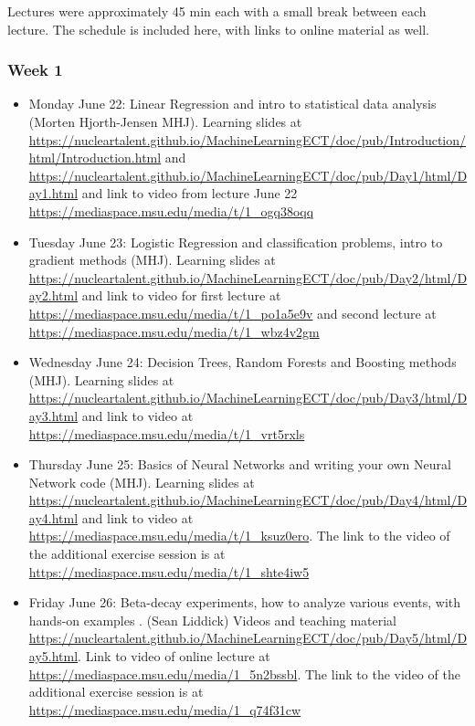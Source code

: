 \documentclass[prc,amsart,english]{revtex4}
\begin{document}
Lectures were approximately 45 min each with a small break between each lecture. 
The schedule is included here, with links to online material as well.

\subsubsection{Week 1}

\begin{itemize}
\item  Monday June 22:  Linear Regression and intro to statistical data analysis	(Morten Hjorth-Jensen MHJ). Learning slides at
\url{https://nucleartalent.github.io/MachineLearningECT/doc/pub/Introduction/html/Introduction.html} and \url{https://nucleartalent.github.io/MachineLearningECT/doc/pub/Day1/html/Day1.html} and link to  video from lecture June 22 \url{https://mediaspace.msu.edu/media/t/1_ogq38oqq}
\item Tuesday June 23:	Logistic Regression and classification problems, intro to gradient methods	(MHJ). Learning slides at \url{https://nucleartalent.github.io/MachineLearningECT/doc/pub/Day2/html/Day2.html} and link to  video for first lecture at \url{https://mediaspace.msu.edu/media/t/1_po1a5e9v} and second lecture at \url{https://mediaspace.msu.edu/media/t/1_wbz4v2gm}
\item Wednesday June 24:	Decision Trees, Random Forests and Boosting methods (MHJ). Learning slides at \url{https://nucleartalent.github.io/MachineLearningECT/doc/pub/Day3/html/Day3.html} and link to  video at \url{https://mediaspace.msu.edu/media/t/1_vrt5rxls}
\item Thursday June 25:	Basics of Neural Networks and writing your own Neural Network code (MHJ). Learning slides at \url{https://nucleartalent.github.io/MachineLearningECT/doc/pub/Day4/html/Day4.html} and link to  video at \url{https://mediaspace.msu.edu/media/t/1_ksuz0ero}. The link to the video of the additional exercise session is at  \url{https://mediaspace.msu.edu/media/t/1_shte4iw5}
\item Friday June 26:	Beta-decay experiments, how to analyze various events, with hands-on examples . (Sean Liddick) Videos and teaching material \url{https://nucleartalent.github.io/MachineLearningECT/doc/pub/Day5/html/Day5.html}. Link to  video of online lecture at \url{https://mediaspace.msu.edu/media/1_5n2bssbl}. The link to the video of the additional exercise session is at \url{https://mediaspace.msu.edu/media/1_q74f31cw}
\end{itemize}
\end{document}
